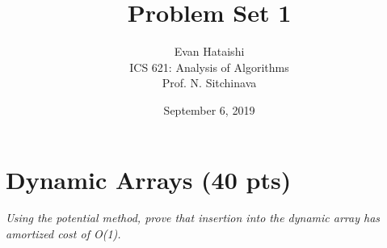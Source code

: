 \documentclass[11pt]{article}
\begin{document}
 
 
\title{Problem Set 1}
\author{Evan Hataishi\\ %
ICS 621: Analysis of Algorithms\\
Prof. N. Sitchinava}
\date{September 6, 2019}

\maketitle

\section{Dynamic Arrays (40 pts)}

\textit{Using the potential method, prove that insertion into the dynamic array has amortized cost of O(1).}\\
\end{document}
